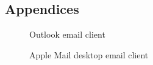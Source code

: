 \documentclass{l4proj}
\begin{document}
%
% 

\begin{appendices}

\chapter{Appendices}

\begin{figure}[H]
    \centering
    \caption{Outlook email client}
    \label{fig:outlook}
\end{figure}



\begin{figure}[H]
    \caption{Apple Mail desktop email client}
    \label{fig:applemail}
\end{figure}




\end{appendices}
\end{document}
